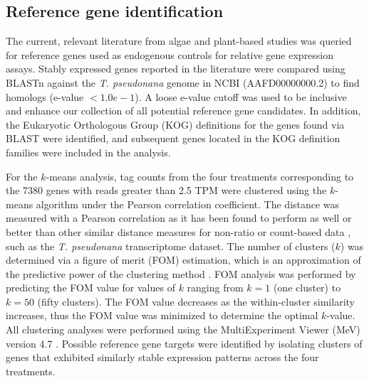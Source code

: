 \subsection{Reference gene identification}
\par The current, relevant literature from algae and plant-based studies was queried for reference genes used as endogenous controls for relative gene expression assays. Stably expressed genes reported in the literature were compared using BLASTn \citep{Altschul1997} against the \textit{T. pseudonana} genome in NCBI (AAFD00000000.2) to find homologs (e-value $< 1.0e-1$). A loose e-value cutoff was used to be inclusive and enhance our collection of all potential reference gene candidates. In addition, the Eukaryotic Orthologous Group (KOG) definitions for the genes found via BLAST were identified, and subsequent genes located in the KOG definition families were included in the analysis.\par 
For the $k$-means analysis, tag counts from the four treatments corresponding to the 7380 genes with reads greater than 2.5 TPM were clustered using the $k$-means algorithm under the Pearson correlation coefficient. The distance was measured with a Pearson correlation as it has been found to perform as well or better than other similar distance measures for non-ratio or count-based data \citep{Gibbons2002}, such as the \textit{T. pseudonana} transcriptome dataset. The number of clusters ($k$) was determined via a figure of merit (FOM) estimation, which is an approximation of the predictive power of the clustering method \citep{Yeung2001}. FOM analysis was performed by predicting the FOM value for values of $k$ ranging from $k=1$ (one cluster) to $k=50$ (fifty clusters). The FOM value decreases as the within-cluster similarity increases, thus the FOM value was minimized to determine the optimal $k$-value. All clustering analyses were performed using the MultiExperiment Viewer (MeV) version 4.7 \citep{Saeed2003, Saeed2006}. Possible reference gene targets were identified by isolating clusters of genes that exhibited similarly stable expression patterns across the four treatments. \par
